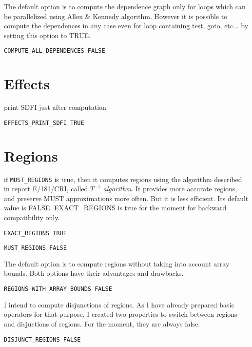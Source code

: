 The default option is to compute the dependence graph only for loops
which can be parallelized using Allen \& Kennedy algorithm.
However it is possible to
compute the dependences in any case even for loop containing test, goto,
etc...
by setting this option to TRUE.

\begin{verbatim}
COMPUTE_ALL_DEPENDENCES FALSE
\end{verbatim}

\section{Effects}

print SDFI just after computation

\begin{verbatim}
EFFECTS_PRINT_SDFI TRUE
\end{verbatim}

\section{Regions}

if {\tt MUST_REGIONS} is true, then it computes regions using the algorithm
described in report E/181/CRI, called {\em $T^{-1}$ algorithm}. It provides more
accurate regions, and preserve MUST approximations more often. But it is less
efficient. Its default value is FALSE. EXACT_REGIONS is true for the moment for
backward compatibility only.

\begin{verbatim}
EXACT_REGIONS TRUE
\end{verbatim}

\begin{verbatim}
MUST_REGIONS FALSE
\end{verbatim}

The default option is to compute regions without taking into account array
bounds. Both options have their advantages and drawbacks. 

\begin{verbatim}
REGIONS_WITH_ARRAY_BOUNDS FALSE
\end{verbatim}

I intend to compute disjunctions of regions. As I have already prepared basic
operators for that purpose, I created two properties to switch between regions
and disjuctions of regions. For the moment, they are always false.

\begin{verbatim}
DISJUNCT_REGIONS FALSE
\end{verbatim}

